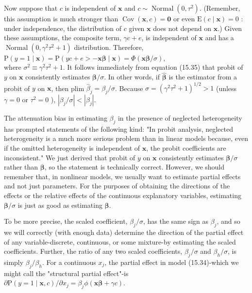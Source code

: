 \documentclass[10pt]{article}
\begin{document}
Now suppose that $c$ is independent of $\mathbf{x}$ and $c \sim \operatorname{Normal}\left(0, \tau^{2}\right)$. (Remember, this assumption is much stronger than $\operatorname{Cov}(\mathbf{x}, c)=\mathbf{0}$ or even $\mathrm{E}(c \mid \mathbf{x})=0$ : under independence, the distribution of $c$ given $\mathbf{x}$ does not depend on $\mathbf{x}$.) Given these assumptions, the composite term, $\gamma c+e$, is independent of $\mathbf{x}$ and has a $\operatorname{Normal}\left(0, \gamma^{2} \tau^{2}+1\right)$ distribution. Therefore,\\
$\mathrm{P}(y=1 \mid \mathbf{x})=\mathrm{P}(y c+e>-\mathbf{x} \boldsymbol{\beta} \mid \mathbf{x})=\Phi(\mathbf{x} \boldsymbol{\beta} / \sigma)$,\\
where $\sigma^{2} \equiv \gamma^{2} \tau^{2}+1$. It follows immediately from equation (15.35) that probit of $y$ on $\mathbf{x}$ consistently estimates $\boldsymbol{\beta} / \sigma$. In other words, if $\hat{\boldsymbol{\beta}}$ is the estimator from a probit of $y$ on $\mathbf{x}$, then plim $\hat{\beta}_{j}=\beta_{j} / \sigma$. Because $\sigma=\left(\gamma^{2} \tau^{2}+1\right)^{1 / 2}>1$ (unless $\gamma=0$ or $\tau^{2}=0$ ), $\left|\beta_{j} / \sigma\right|<\left|\beta_{j}\right|$.

The attenuation bias in estimating $\beta_{j}$ in the presence of neglected heterogeneity has prompted statements of the following kind: "In probit analysis, neglected heterogeneity is a much more serious problem than in linear models because, even if the omitted heterogeneity is independent of $\mathbf{x}$, the probit coefficients are inconsistent." We just derived that probit of $y$ on $\mathbf{x}$ consistently estimates $\boldsymbol{\beta} / \sigma$ rather than $\boldsymbol{\beta}$, so the statement is technically correct. However, we should remember that, in nonlinear models, we usually want to estimate partial effects and not just parameters. For the purposes of obtaining the directions of the effects or the relative effects of the continuous explanatory variables, estimating $\boldsymbol{\beta} / \sigma$ is just as good as estimating $\boldsymbol{\beta}$.

To be more precise, the scaled coefficient, $\beta_{j} / \sigma$, has the same sign as $\beta_{j}$, and so we will correctly (with enough data) determine the direction of the partial effect of any variable-discrete, continuous, or some mixture-by estimating the scaled coefficients. Further, the ratio of any two scaled coefficients, $\beta_{j} / \sigma$ and $\beta_{h} / \sigma$, is simply $\beta_{j} / \beta_{h}$. For a continuous $x_{j}$, the partial effect in model (15.34)-which we might call the "structural partial effect"-is\\
$\partial \mathrm{P}(y=1 \mid \mathbf{x}, c) / \partial x_{j}=\beta_{j} \phi(\mathbf{x} \boldsymbol{\beta}+\gamma c)$.
\end{document}
